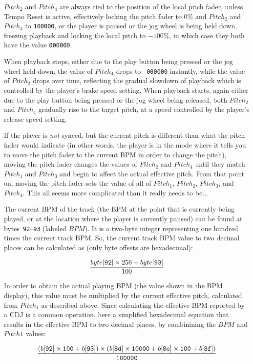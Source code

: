 \documentclass[11pt]{article}
\begin{document}
$Pitch_2$ and $Pitch_4$ are always tied to the position of the local
pitch fader, unless Tempo Reset is active, effectively locking the
pitch fader to 0\% and $Pitch_2$ and $Pitch_4$ to {\tt 100000}, or
the player is paused or the jog wheel is being held down, freezing
playback and locking the local pitch to $-100\%$, in which case they
both have the value {\tt 000000}.

When playback stops, either due to the play button being pressed or
the jog wheel held down, the value of $Pitch_4$ drops to {\tt
  000000} instantly, while the value of $Pitch_2$ drops over time,
reflecting the gradual slowdown of playback which is controlled by the
player's brake speed setting. When playback starts, again either due
to the play button being pressed or the jog wheel being released, both
$Pitch_2$ and $Pitch_4$ gradually rise to the target pitch, at a speed
controlled by the player's release speed setting.

If the player is \emph{not} synced, but the current pitch is different
than what the pitch fader would indicate (in other words, the player
is in the mode where it tells you to move the pitch fader to the
current BPM in order to change the pitch), moving the pitch fader
changes the values of $Pitch_2$ and $Pitch_4$ until they match
$Pitch_1$ and $Pitch_3$ and begin to affect the actual effective
pitch. From that point on, moving the pitch fader sets the value of
all of $Pitch_1$, $Pitch_2$, $Pitch_3$, and $Pitch_4$. This all seems
more complicated than it really needs to be...

The current BPM of the track (the BPM at the point that is currently
being played, or at the location where the player is currently paused)
can be found at bytes~{\tt 92}--{\tt 93} (labeled $BPM$). It is a
two-byte integer representing one hundred times the current track BPM.
So, the current track BPM value to two decimal places can be
calculated as (only byte offsets are hexadecimal):

\[ \frac{byte[{\tt 92}] \times 256 + byte[{\tt 93}]}{100} \]

In order to obtain the actual playing BPM (the value shown in the BPM
display), this value must be multiplied by the current effective
pitch, calculated from $Pitch_1$ as described above. Since calculating
the effective BPM reported by a CDJ is a common operation, here a
simplified hexadecimal equation that results in the effective BPM to
two decimal places, by combinining the $BPM$ and $Pitch1$ values:

\[ \frac{(b[{\tt 92}] \times {\tt 100} + b[{\tt 93}]) \times (b[{\tt 8d}]
  \times {\tt 10000} + b[{\tt 8e}] \times {\tt 100} + b[{\tt 8f}])}
   {{\tt 100000}} \]
\end{document}
